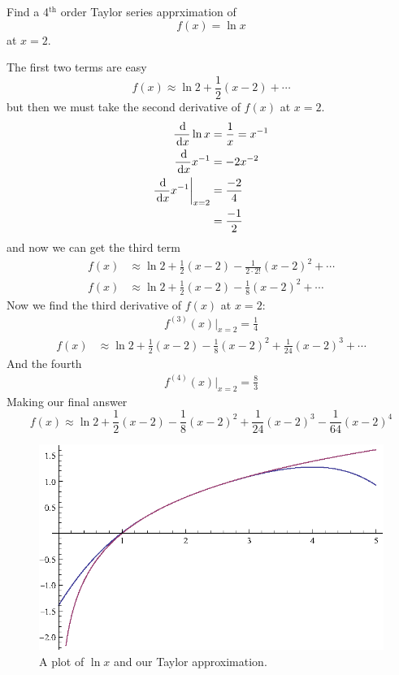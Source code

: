 \begin{ex}
  Find a 4$^\textrm{th}$ order Taylor series apprximation of
  \[ f(x) = \ln x \]
  at $x=2$.
  \begin{sol}
    The first two terms are easy
    \[ f(x) \approx \ln{2} + \frac{1}{2} (x-2) + \cdots \]
    but then we must take the second derivative of $f(x)$ at $x=2$.
    \begin{align*}
      \frac{\,\mathrm{d}}{\,\mathrm{d} x} \ln x &= \frac{1}{x} = x^{-1} \\
      \frac{\,\mathrm{d}}{\,\mathrm{d} x} x^{-1} &= -2 x^{-2} \\
      \frac{\,\mathrm{d}}{\,\mathrm{d} x} x^{-1}\bigg|_{x=2}&= \frac{-2}{4} \\
      &= \frac{-1}{2}
    \end{align*}
    and now we can get the third term
    \begin{align*}
      f(x) &\approx \ln{2} + \frac{1}{2} (x-2) - \frac{1}{2\cdot 2!}(x-2)^2 + \cdots \\
      f(x) &\approx \ln{2} + \frac{1}{2} (x-2) - \frac{1}{8}(x-2)^2 + \cdots
    \end{align*}
    Now we find the third derivative of $f(x)$ at $x=2$:
    \begin{align*}
      f^{(3)}(x)\bigg|_{x=2}=\frac{1}{4}
    \end{align*}
    \begin{align*}
      f(x) &\approx \ln{2} + \frac{1}{2} (x-2) - \frac{1}{8}(x-2)^2 + \frac{1}{24}(x-2)^3 + \cdots
    \end{align*}
    And the fourth
    \begin{align*}
      f^{(4)}(x)\bigg|_{x=2}=\frac{8}{3}
    \end{align*}
    Making our final answer
    \[
      f(x) \approx \ln{2} + \frac{1}{2} (x-2) - \frac{1}{8}(x-2)^2 + \frac{1}{24}(x-2)^3 -\frac{1}{64}(x-2)^4
    \]
    \begin{figure}[H]
      \begin{center}
        \includegraphics{continuous/series/lnxtaylor}
      \end{center}
      \caption{A plot of $\ln x$ and our Taylor approximation.}
    \end{figure}
  \end{sol}
\end{ex}
